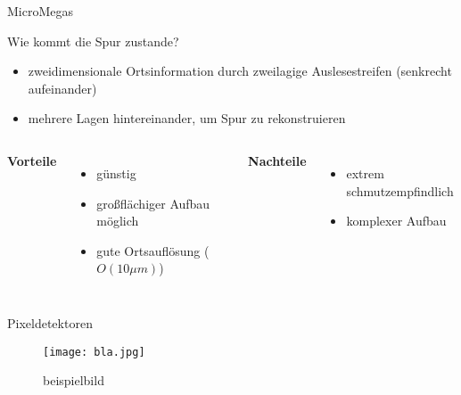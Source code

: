 \begin{frame}{MicroMegas}

	\begin{block}{Wie kommt die Spur zustande?}
		\begin{itemize}
		  \item zweidimensionale Ortsinformation durch zweilagige Auslesestreifen (senkrecht aufeinander)
		  \item mehrere Lagen hintereinander, um Spur zu rekonstruieren
		\end{itemize}
	\end{block}
	\vspace{0.8cm}
    \begin{columns}[T]
			\textbf{Vorteile}		
			\begin{itemize}
			  \item günstig
			  \item großflächiger Aufbau möglich
			  \item gute Ortsauflösung ($O(10\mu m)$)
			\end{itemize}	
	    	\textbf{Nachteile}
	    	\begin{itemize}
			  \item extrem schmutzempfindlich
			  \item komplexer Aufbau
			\end{itemize}
    \end{columns}
    \vspace{1cm}
\end{frame}

   \begin{frame}{Pixeldetektoren}
			\begin{figure}[htbp]
			  \centering
			  \texttt{[image: bla.jpg]}
			  \caption{beispielbild}
			\end{figure}
\end{frame}
